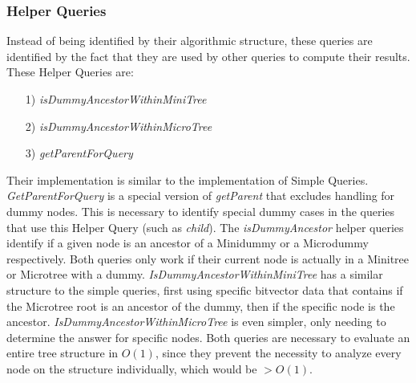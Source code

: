 \documentclass{article}
\begin{document}
\subsubsection{Helper Queries}
Instead of being identified by their algorithmic structure, these queries are identified by the fact that they are used by other queries to compute their results.\\
These Helper Queries are:
\begin{itemize}
	\item[1)] \textit{isDummyAncestorWithinMiniTree}
	\item[2)] \textit{isDummyAncestorWithinMicroTree}
	\item[3)] \textit{getParentForQuery}
\end{itemize}
Their implementation is similar to the implementation of Simple Queries.\\
\textit{GetParentForQuery} is a special version of \textit{getParent} that excludes handling for dummy nodes. This is necessary to identify special dummy cases in the queries that use this Helper Query (such as \textit{child}).
The \textit{isDummyAncestor} helper queries identify if a given node is an ancestor of a Minidummy or a Microdummy respectively. Both queries only work if their current node is actually in a Minitree or Microtree with a dummy. \textit{IsDummyAncestorWithinMiniTree} has a similar structure to the simple queries, first using specific bitvector data that contains if the Microtree root is an ancestor of the dummy, then if the specific node is the ancestor. \textit{IsDummyAncestorWithinMicroTree} is even simpler, only needing to determine the answer for specific nodes. Both queries are necessary to evaluate an entire tree structure in $O(1)$, since they prevent the necessity to analyze every node on the structure individually, which would be $> O(1)$.
\end{document}
